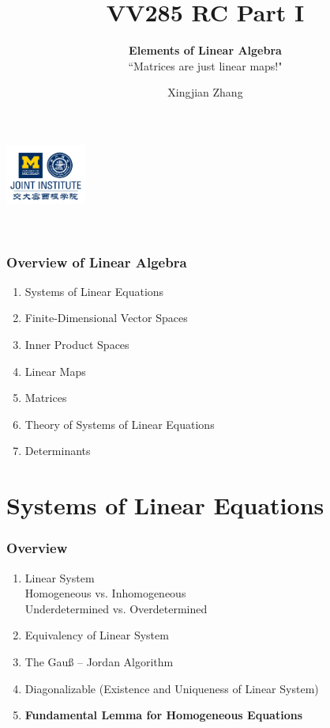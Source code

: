 \documentclass{beamer}
\title{VV285 RC Part I}
\subtitle{\textbf{Elements of Linear Algebra}\\``Matrices are just linear maps!"}
\institute[UM-SJTU JI]{Univerity of Michigan-Shanghai Jiao Tong University Joint Institute}
\author{Xingjian Zhang}
\begin{document}
\begin{frame}
    \titlepage
    \begin{center}
        \includegraphics[height=2cm]{logo2.png}
    \end{center}
\end{frame}

\begin{frame}
    \
    \frametitle{Overview of Linear Algebra}
    \begin{enumerate}
        \item Systems of Linear Equations
        \item Finite-Dimensional Vector Spaces
        \item Inner Product Spaces
        \item Linear Maps
        \item Matrices
        \item Theory of Systems of Linear Equations
        \item Determinants
    \end{enumerate}
\end{frame}

\section{Systems of Linear Equations}
\begin{frame}
    \frametitle{Overview}
    \begin{enumerate}
        \item Linear System
              \\ Homogeneous vs. Inhomogeneous
              \\ Underdetermined vs. Overdetermined
        \item Equivalency of Linear System
        \item The Gauß – Jordan Algorithm
        \item Diagonalizable (Existence and Uniqueness of Linear System)
        \item \textbf{Fundamental Lemma for Homogeneous Equations}
    \end{enumerate}
\end{frame}
\end{document}
